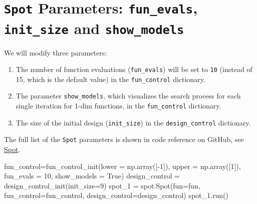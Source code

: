 \documentclass[
  letterpaper,
  DIV=11,
  numbers=noendperiod]{scrreprt}
\newenvironment{Shaded}{\begin{snugshade}}{\end{snugshade}}
\newcommand{\DecValTok}[1]{\textcolor[rgb]{0.68,0.00,0.00}{#1}}
\newcommand{\NormalTok}[1]{\textcolor[rgb]{0.00,0.23,0.31}{#1}}
\newcommand{\OperatorTok}[1]{\textcolor[rgb]{0.37,0.37,0.37}{#1}}
\newcommand{\VariableTok}[1]{\textcolor[rgb]{0.07,0.07,0.07}{#1}}
\providecommand{\tightlist}{%
  \setlength{\itemsep}{0pt}\setlength{\parskip}{0pt}}\usepackage{longtable,booktabs,array}
\begin{document}
\section{\texorpdfstring{\texttt{Spot} Parameters: \texttt{fun\_evals},
\texttt{init\_size} and
\texttt{show\_models}}{Spot Parameters: fun\_evals, init\_size and show\_models}}\label{spot-parameters-fun_evals-init_size-and-show_models}

We will modify three parameters:

\begin{enumerate}
\def\labelenumi{\arabic{enumi}.}
\tightlist
\item
  The number of function evaluations (\texttt{fun\_evals}) will be set
  to \texttt{10} (instead of 15, which is the default value) in the
  \texttt{fun\_control} dictionary.
\item
  The parameter \texttt{show\_models}, which visualizes the search
  process for each single iteration for 1-dim functions, in the
  \texttt{fun\_control} dictionary.
\item
  The size of the initial design (\texttt{init\_size}) in the
  \texttt{design\_control} dictionary.
\end{enumerate}

The full list of the \texttt{Spot} parameters is shown in code reference
on GitHub, see
\href{https://sequential-parameter-optimization.github.io/spotPython/reference/spotPython/spot/spot/\#spotPython.spot.spot}{Spot}.

\begin{Shaded}
\begin{Highlighting}[]
\NormalTok{fun\_control}\OperatorTok{=}\NormalTok{fun\_control\_init(lower }\OperatorTok{=}\NormalTok{ np.array([}\OperatorTok{{-}}\DecValTok{1}\NormalTok{]),}
\NormalTok{                     upper }\OperatorTok{=}\NormalTok{ np.array([}\DecValTok{1}\NormalTok{]),}
\NormalTok{                     fun\_evals }\OperatorTok{=} \DecValTok{10}\NormalTok{,}
\NormalTok{                     show\_models }\OperatorTok{=} \VariableTok{True}\NormalTok{)               }
\NormalTok{design\_control }\OperatorTok{=}\NormalTok{ design\_control\_init(init\_size}\OperatorTok{=}\DecValTok{9}\NormalTok{)}
\NormalTok{spot\_1 }\OperatorTok{=}\NormalTok{ spot.Spot(fun}\OperatorTok{=}\NormalTok{fun,}
\NormalTok{                   fun\_control}\OperatorTok{=}\NormalTok{fun\_control,}
\NormalTok{                   design\_control}\OperatorTok{=}\NormalTok{design\_control)}
\NormalTok{spot\_1.run()}
\end{Highlighting}
\end{Shaded}
\end{document}
